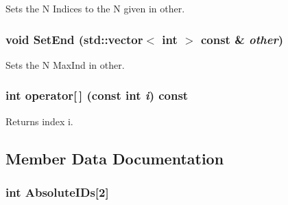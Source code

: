 Sets the N Indices to the N given in other. \hypertarget{classJKBuilder_1_1Iterator_aad84ec668b5f41210db34c540aaa31fc}{
\subsubsection[{SetEnd}]{\setlength{\rightskip}{0pt plus 5cm}void SetEnd (std::vector$<$ int $>$ const \& {\em other})}}
\label{classJKBuilder_1_1Iterator_aad84ec668b5f41210db34c540aaa31fc}


Sets the N MaxInd in other. \hypertarget{classJKBuilder_1_1Iterator_a74247cf730a06b23fcb1ec64e5596b25}{
\subsubsection[{operator[]}]{\setlength{\rightskip}{0pt plus 5cm}int operator\mbox{[}$\,$\mbox{]} (const int {\em i}) const}}
\label{classJKBuilder_1_1Iterator_a74247cf730a06b23fcb1ec64e5596b25}


Returns index i. 

\subsection{Member Data Documentation}
\hypertarget{classJKBuilder_1_1PairIterator_a5c96d22e39dea8044c7caf8c1213e813}{
\subsubsection[{AbsoluteIDs}]{\setlength{\rightskip}{0pt plus 5cm}int {\bf AbsoluteIDs}\mbox{[}2\mbox{]}}}
\label{classJKBuilder_1_1PairIterator_a5c96d22e39dea8044c7caf8c1213e813}


